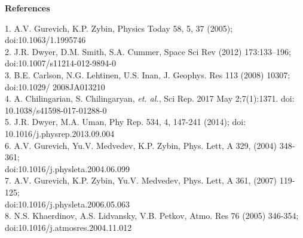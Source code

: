 \documentclass[11pt]{article}
\begin{document}
\begin{multicols*}{2}


\end{multicols*}


    \newpage
    \noindent
{\bf \LARGE References}\\
\setlength{\parskip}{0em}


    \begin{hangparas}{.25in}{1}
    1. A.V. Gurevich, K.P. Zybin, Physics Today 58, 5, 37 (2005); doi:10.1063/1.1995746\\
    
    2. J.R. Dwyer, D.M. Smith, S.A. Cummer, Space Sci Rev (2012) 173:133–196; doi:10.1007/s11214-012-9894-0\\
    
    3. B.E. Carlson, N.G. Lehtinen, U.S. Inan, J. Geophys. Res 113 (2008) 10307; doi:10.1029/ 2008JA013210\\
    
    4. A. Chilingarian, S. Chilingaryan, \emph{et. al.}, Sci Rep. 2017 May 2;7(1):1371. doi: 10.1038/s41598-017-01288-0\\
    
    5. J.R. Dwyer, M.A. Uman, Phy Rep. 534, 4, 147-241 (2014); doi: 10.1016/j.physrep.2013.09.004\\
    
    6. A.V. Gurevich, Yu.V. Medvedev, K.P. Zybin, Phys. Lett, A 329, (2004) 348-361;\\ doi:10.1016/j.physleta.2004.06.099\\
    
    7. A.V. Gurevich, K.P. Zybin, Yu.V. Medvedev, Phys. Lett, A 361, (2007) 119-125;\\ doi:10.1016/j.physleta.2006.05.063\\
    
    8. N.S. Khaerdinov, A.S. Lidvansky, V.B. Petkov, Atmo. Res 76 (2005) 346-354;\\ doi:10.1016/j.atmosres.2004.11.012\\
    \end{hangparas}
\end{document}
